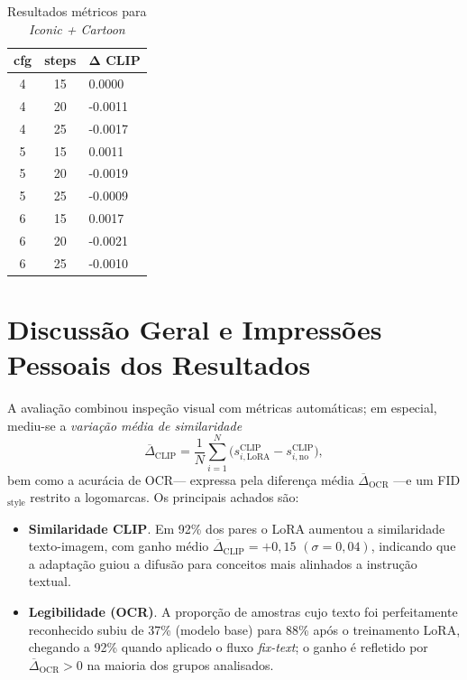 \documentclass[12pt, %
openright, 
oneside, %
a4paper,    %
brazil]{facom-ufu-abntex2}
\begin{document}
\begin{table}[H]
\centering
\small
\setlength{\tabcolsep}{4pt}
\begin{tabularx}{\linewidth}{|c|c|X|}
\hline
\textbf{cfg} & \textbf{steps} & \(\boldsymbol{\Delta}\) \textbf{CLIP} \\ \hline
4 & 15 &  0.0000 \\ \hline
4 & 20 & -0.0011 \\ \hline
4 & 25 & -0.0017 \\ \hline
5 & 15 &  0.0011 \\ \hline
5 & 20 & -0.0019 \\ \hline
5 & 25 & -0.0009 \\ \hline
6 & 15 &  0.0017 \\ \hline
6 & 20 & -0.0021 \\ \hline
6 & 25 & -0.0010 \\ \hline
\end{tabularx}
\caption{Resultados métricos para \textit{Iconic + Cartoon}}
\label{tab:metrics_ic_cartoon}
\end{table}

\section{Discussão Geral e Impressões Pessoais dos Resultados}

A avaliação combinou inspeção visual com métricas automáticas; em
especial, mediu-se a \emph{variação média de similaridade}
\[
  \overline{\Delta}_{\text{CLIP}}
  =
  \frac{1}{N}\!
  \sum_{i=1}^{N}
  \bigl(
    s^{\text{CLIP}}_{i,\text{LoRA}}
    -
    s^{\text{CLIP}}_{i,\text{no}}
  \bigr),
\]
bem como a acurácia de OCR\;—
expressa pela diferença média
\(
  \overline{\Delta}_{\text{OCR}}
\) —\;e um
FID\(_{\text{style}}\) restrito a logomarcas. Os principais achados são:

\begin{itemize}
  \item \textbf{Similaridade CLIP}.  
        Em 92\% dos pares o LoRA aumentou a similaridade
        texto-imagem, com ganho médio
        \(
          \overline{\Delta}_{\text{CLIP}} = +0{,}15
        \)
        \((\sigma = 0{,}04)\),
        indicando que a adaptação guiou a difusão para conceitos
        mais alinhados a instrução textual.

  \item \textbf{Legibilidade (OCR)}.  
        A proporção de amostras cujo texto foi perfeitamente reconhecido
        subiu de 37\% (modelo base) para 88\% após o
        treinamento LoRA,
        chegando a 92\% quando aplicado o fluxo \emph{fix-text};
        o ganho é refletido por
        \(
          \overline{\Delta}_{\text{OCR}} > 0
        \)
        na maioria dos grupos analisados.
\end{itemize}
\end{document}
